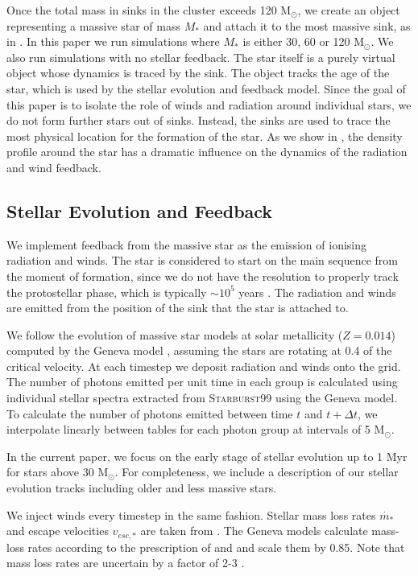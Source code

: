 \documentclass[a4paper,fleqn,usenatbib]{mnras}
\newcommand{\Msolar}{M$_{\odot}$\xspace}
\begin{document}
Once the total mass in sinks in the cluster exceeds 120 \Msolar, we create an object representing a massive star of mass $M_*$ and attach it to the most massive sink, as in \citet{Geen2018}. In this paper we run simulations where $M_*$ is either 30, 60 or 120 \Msolar. We also run simulations with no stellar feedback. The star itself is a purely virtual object whose dynamics is traced by the sink. The object tracks the age of the star, which is used by the stellar evolution and feedback model. Since the goal of this paper is to isolate the role of winds and radiation around individual stars, we do not form further stars out of sinks. Instead, the sinks are used to trace the most physical location for the formation of the star. As we show in \citet{Geen2019}, the density profile around the star has a dramatic influence on the dynamics of the radiation and wind feedback.

\subsection{Stellar Evolution and Feedback}

We implement feedback from the massive star as the emission of ionising radiation and winds. The star is considered to start on the main sequence from the moment of formation, since we do not have the resolution to properly track the protostellar phase, which is typically $\sim 10^5$ years \citep{Hosokawa2009}. The radiation and winds are emitted from the position of the sink that the star is attached to.

We follow the evolution of massive star models at solar metallicity ($Z=0.014$) computed by the Geneva model \citep{Ekstrom2012}, assuming the stars are rotating at 0.4 of the critical velocity. At each timestep we deposit radiation and winds onto the grid. The number of photons emitted per unit time in each group is calculated using individual stellar spectra extracted from \textsc{Starburst99} \citep{Leitherer2014} using the Geneva model. To calculate the number of photons emitted between time $t$ and $t+\Delta t$, we interpolate linearly between tables for each photon group at intervals of 5 \Msolar.

In the current paper, we focus on the early stage of stellar evolution up to 1 Myr for stars above 30 \Msolar. For completeness, we include a description of our stellar evolution tracks including older and less massive stars.

We inject winds every timestep in the same fashion. Stellar mass loss rates $\dot{m_*}$ and escape velocities $v_{esc,*}$ are taken from \citet{Ekstrom2012}. The Geneva models calculate mass-loss rates according to the prescription of \cite{Vink2000} and \cite{Vink2001} and scale them by 0.85. Note that mass loss rates are uncertain by a factor of 2-3 \citep{Keszthelyi2017,Puls2015,Smith2014}.
\end{document}
